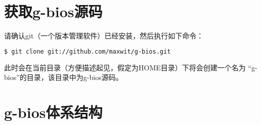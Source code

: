 \section{获取g-bios源码}
请确认git（一个版本管理软件）已经安装，然后执行如下命令：
\begin{lstlisting}[language=bash,numbers=none]
$ git clone git://github.com/maxwit/g-bios.git
\end{lstlisting}
此时会在当前目录（方便描述起见，假定为HOME目录）下将会创建一个名为 ``g-bios''的目录，该目录中为g-bios源码。

\section{g-bios体系结构}
